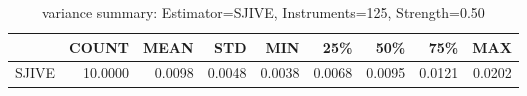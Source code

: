 \begin{table}[ht]
\centering
\caption{variance summary: Estimator=SJIVE, Instruments=125, Strength=0.50}
\begin{tabular}{lrrrrrrrr}
\toprule
 & COUNT & MEAN & STD & MIN & 25\% & 50\% & 75\% & MAX \\
\midrule
SJIVE & 10.0000 & 0.0098 & 0.0048 & 0.0038 & 0.0068 & 0.0095 & 0.0121 & 0.0202 \\
\bottomrule
\end{tabular}
\end{table}
